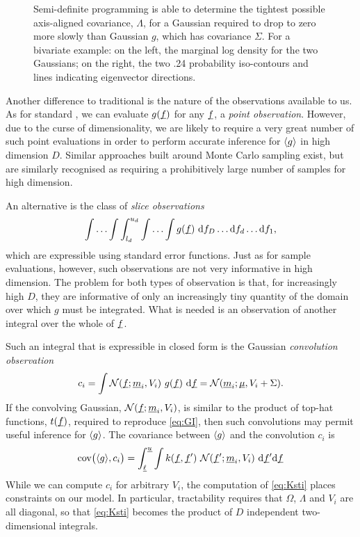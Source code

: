 \documentclass[twoside]{article}
\begin{document}
\begin{figure}
\caption{Semi-definite programming is able to determine the tightest possible axis-aligned covariance, $\Lambda$, for a Gaussian required to drop to zero more slowly than Gaussian $g$, which has covariance $\Sigma$. For a bivariate example: on the left, the marginal log density for the two Gaussians; on the right, the two .24 probability iso-contours and lines indicating eigenvector directions.}
\label{fig:bounding_ellipse}
\end{figure}

Another difference to traditional  is the nature of the observations available to us. As for standard , we can evaluate $g(\underline{\smash{f}})$ for any $\underline{\smash{f}}$, a \emph{point observation}. However, due to the curse of dimensionality, we are likely to require a very great number of such point evaluations in order to perform accurate inference for $\langle g \rangle$ in high dimension $D$. Similar approaches built around Monte Carlo sampling \citep{genz1992numerical} exist, but are similarly recognised as requiring a prohibitively large number of samples for high dimension. 

An alternative is the class of \emph{slice observations}
\begin{equation}
 \int \ldots \int \int_{l_d}^{u_d} \int \ldots \int g(\underline{\smash{f}})~\mathrm{d} f_D \ldots \mathrm{d} f_d\ldots \mathrm{d} f_1,
\end{equation}
which are expressible using standard error functions. Just as for sample evaluations, however, such observations are not very informative in high dimension. The problem for both types of observation is that, for increasingly high $D$, they are informative of only an increasingly tiny quantity of the domain over which $g$ must be integrated. What is needed is an observation of another integral over the whole of $\underline{\smash{f}}$.

Such an integral that is expressible in closed form is the Gaussian \emph{convolution observation}
 \begin{equation}\label{eq:conv}
 c_i = \int \mathcal{N}(\underline{\smash{f}};\underline{\smash{m}}_i,V_i)~g(\underline{\smash{f}})~\mathrm{d} \underline{\smash{f}} = \mathcal{N}(\underline{\smash{m}}_i;\underline{\smash{\mu}},V_i+\Sigma).
\end{equation}
 If the convolving Gaussian, $\mathcal{N}(\underline{\smash{f}};\underline{\smash{m}}_i,V_i)$, is similar to the product of top-hat functions, $t(\underline{\smash{f}})$, required to reproduce \eqref{eq:GI}, then such convolutions may permit useful inference for $\langle g \rangle$. The covariance between $\langle g \rangle$ and the convolution $c_i$ is
\begin{align}\label{eq:Ksti}
\text{cov}\bigl(\langle g \rangle, c_i\bigr) =
\int_{\underline{\smash{\ell}}}^{\underline{\smash{u}}} \int  k(\underline{\smash{f}}, \underline{\smash{f}}')~\mathcal{N}(\underline{\smash{f}}';\underline{\smash{m}}_i,V_i)~\mathrm{d} \underline{\smash{f}}' \mathrm{d} \underline{\smash{f}} 
\end{align}
While we can compute $c_i$ for arbitrary $V_i$, the computation of \eqref{eq:Ksti} places constraints on our model. In particular, tractability requires that $\Omega$, $\Lambda$ and $V_i$ are all diagonal, so that \eqref{eq:Ksti} becomes the product of $D$ independent two-dimensional integrals.
\end{document}
